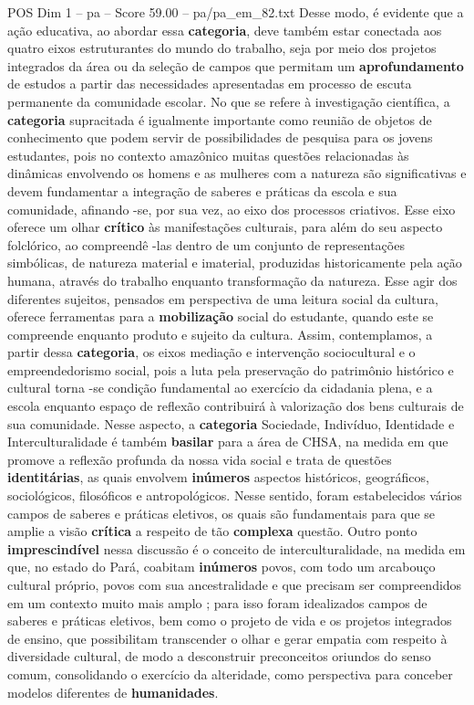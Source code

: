\begin{textsample}{POS Dim 1 – pa – Score 59.00 – pa/pa\_em\_82.txt}
Desse modo, é evidente que a ação educativa, ao abordar essa \textbf{categoria}, deve também estar conectada aos quatro eixos estruturantes do mundo do trabalho, seja por meio dos projetos integrados da área ou da seleção de campos que permitam um \textbf{aprofundamento} de estudos a partir das necessidades apresentadas em processo de escuta permanente da comunidade escolar.
No que se refere à investigação científica, a \textbf{categoria} supracitada é igualmente importante como reunião de objetos de conhecimento que podem servir de possibilidades de pesquisa para os jovens estudantes, pois no contexto amazônico muitas questões relacionadas às dinâmicas envolvendo os homens e as mulheres com a natureza são significativas e devem fundamentar a integração de saberes e práticas da escola e sua comunidade, afinando -se, por sua vez, ao eixo dos processos criativos.
Esse eixo oferece um olhar \textbf{crítico} às manifestações culturais, para além do seu aspecto folclórico, ao compreendê -las dentro de um conjunto de representações simbólicas, de natureza material e imaterial, produzidas historicamente pela ação humana, através do trabalho enquanto transformação da natureza.
Esse agir dos diferentes sujeitos, pensados em perspectiva de uma leitura social da cultura, oferece ferramentas para a \textbf{mobilização} social do estudante, quando este se compreende enquanto produto e sujeito da cultura.
Assim, contemplamos, a partir dessa \textbf{categoria}, os eixos mediação e intervenção sociocultural e o empreendedorismo social, pois a luta pela preservação do patrimônio histórico e cultural torna -se condição fundamental ao exercício da cidadania plena, e a escola enquanto espaço de reflexão contribuirá à valorização dos bens culturais de sua comunidade.
Nesse aspecto, a \textbf{categoria} Sociedade, Indivíduo, Identidade e Interculturalidade é também \textbf{basilar} para a área de CHSA, na medida em que promove a reflexão profunda da nossa vida social e trata de questões \textbf{identitárias}, as quais envolvem \textbf{inúmeros} aspectos históricos, geográficos, sociológicos, filosóficos e antropológicos.
Nesse sentido, foram estabelecidos vários campos de saberes e práticas eletivos, os quais são fundamentais para que se amplie a visão \textbf{crítica} a respeito de tão \textbf{complexa} questão.
Outro ponto \textbf{imprescindível} nessa discussão é o conceito de interculturalidade, na medida em que, no estado do Pará, coabitam \textbf{inúmeros} povos, com todo um arcabouço cultural próprio, povos com sua ancestralidade e que precisam ser compreendidos em um contexto muito mais amplo ; para isso foram idealizados campos de saberes e práticas eletivos, bem como o projeto de vida e os projetos integrados de ensino, que possibilitam transcender o olhar e gerar empatia com respeito à diversidade cultural, de modo a desconstruir preconceitos oriundos do senso comum, consolidando o exercício da alteridade, como perspectiva para conceber modelos diferentes de \textbf{humanidades}.

\end{textsample}
